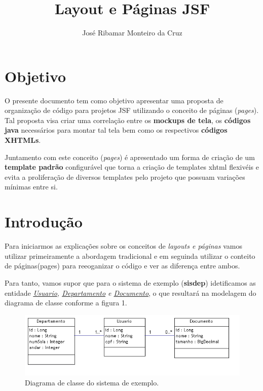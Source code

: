 \documentclass[a4paper,10pt]{article}
\begin{document}
\title{Layout e Páginas JSF}
\author{José Ribamar Monteiro da Cruz}
\maketitle
\tableofcontents
%
\section{Objetivo}

O presente documento tem como objetivo apresentar uma proposta de
organização de código para projetos JSF utilizando o conceito de páginas (\emph{pages}).
Tal proposta visa criar uma correlação entre os \textbf{mockups de tela},
os \textbf{códigos java} necessários para montar tal tela bem como os
respectivos \textbf{códigos XHTMLs}.

Juntamento com este conceito (\emph{pages}) é apresentado um forma de criação de
um \textbf{template padrão} configurável que torna a criação de templates xhtml
flexivéis e evita a proliferação de diversos templates pelo projeto que possuam
variações mínimas entre si.
% 
%
\newpage
\section{Introdução}
Para iniciarmos as explicações sobre os conceitos de \emph{layouts e páginas}
vamos utilizar primeiramente a abordagem tradicional e em seguinda utilizar o
conteito de páginas(pages) para reeoganizar o código e ver as diferença entre
ambos.

Para tanto, vamos supor que para o sistema de exemplo (\textbf{sisdep})
idetificamos as entidade \emph{\underline{Usuario}, \underline{Departamento} e \underline{Documento}}, o
que resultará na modelagem do diagrama de classe conforme a figura 1.
 	\begin{figure}[h]
		\centering
	 	\includegraphics[scale=.8]{images/class.png} 
	 	\caption{Diagrama de classe do sistema de exemplo.}
	\end{figure} 
\end{document}
